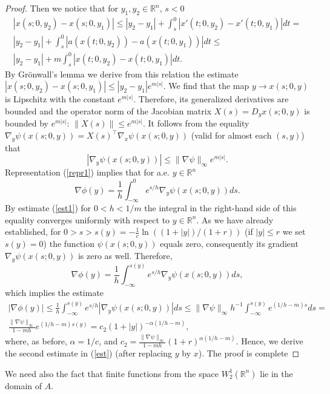 \documentclass[12pt]{article}
\newcommand{\R}{{\mathbb R}}
\numberwithin{equation}{section}
\theoremstyle{plain}
\theoremstyle{definition}
\begin{document}
\begin{proof}
Then we notice that for $y_1,y_2\in\R^n$, $s<0$
\begin{align*}
|x(s;0,y_2)-x(s;0,y_1)|\le |y_2-y_1|+\int_s^0 |x'(t;0,y_2)-x'(t;0,y_1)|dt= \\
|y_2-y_1|+\int_s^0 |a(x(t;0,y_2))-a(x(t;0,y_1))|dt \le \\ |y_2-y_1|+m\int_s^0 |x(t;0,y_2)-x(t;0,y_1)|dt.
\end{align*}
By Gr\"{o}nwall's lemma we derive from this relation the estimate $|x(s;0,y_2)-x(s;0,y_1)|\le |y_2-y_1|e^{m|s|}$.
We find that the map $y\to x(s;0,y)$ is Lipschitz with the constant $e^{m|s|}$. Therefore, its generalized derivatives are bounded and the operator norm of the Jacobian matrix
$X(s)=D_yx(s;0,y)$ is bounded by $e^{m|s|}$: $\|X(s)\|\le e^{m|s|}$. It follows from the equality  $\nabla_y\psi(x(s;0,y))=X(s)^\top\nabla_x \psi(x(s;0,y))$ (valid for almost each $(s,y)$) that
\begin{equation}\label{est1}
|\nabla_y\psi(x(s;0,y))|\le \|\nabla\psi\|_\infty e^{m|s|}.
\end{equation}
Representation (\ref{repr1}) implies that for a.e. $y\in\R^n$
\begin{equation}\label{repr2}
\nabla\phi(y)=\frac{1}{h}\int_{-\infty}^0 e^{s/h}\nabla_y\psi(x(s;0,y))ds.
\end{equation}
By estimate (\ref{est1}) for $0<h<1/m$ the integral in the right-hand side of this equality converges uniformly with respect to $y\in\R^n$. As we have already established, for $0>s>s(y)=-\frac{1}{c}\ln((1+|y|)/(1+r))$ (if $|y|\le r$ we set
$s(y)=0$) the function $\psi(x(s;0,y))$ equals zero, consequently its gradient $\nabla_y\psi(x(s;0,y))$ is zero as well. Therefore,
\[
\nabla\phi(y)=\frac{1}{h}\int_{-\infty}^{s(y)} e^{s/h}\nabla_y\psi(x(s;0,y))ds,
\]
which implies the estimate
\begin{align*}
|\nabla\phi(y)|\le\frac{1}{h}\int_{-\infty}^{s(y)} e^{s/h}|\nabla_y\psi(x(s;0,y))|ds\le
\|\nabla\psi\|_\infty h^{-1}\int_{-\infty}^{s(y)} e^{(1/h-m)s}ds= \\ \frac{\|\nabla \psi\|_\infty}{1-mh}e^{(1/h-m)s(y)}=c_2(1+|y|)^{-\alpha(1/h-m)},
\end{align*}
where, as before, $\alpha=1/c$, and $c_2=\frac{\|\nabla\psi\|_\infty}{1-mh}(1+r)^{\alpha(1/h-m)}$. Hence, we derive the second estimate in (\ref{est}) (after replacing $y$ by $x$).
The proof is complete
\end{proof}
We need also the fact that finite functions from the space $W_2^1(\R^n)$ lie in the domain of $A$.
\end{document}
